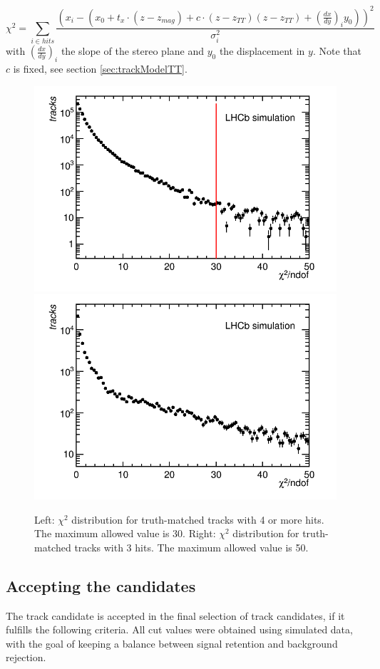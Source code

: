 \begin{equation}
\chi^{2} = \sum_{i \in hits} \frac{ \left(x_{i} - (x_{0} + t_{x}\cdot(z-z_{mag}) + c \cdot (z - z_{TT})(z - z_{TT}) + \left( \frac{dx}{dy} \right)_{i} y_{0}) \right)^{2}  }{\sigma_{i}^{2}}
\end{equation}
with $\left( \frac{dx}{dy} \right)_{i}$ the slope of the stereo plane and
$y_{0}$ the displacement in $y$. Note that $c$ is fixed, see section \ref{sec:trackModelTT}.

\begin{figure}[!htbp]
 \begin{center}
  \includegraphics[width=0.49\linewidth]{figures/chi2Cut1.png}
  \includegraphics[width=0.49\linewidth]{figures/chi2Cut3Hits1.png}
   \caption{Left: $\chi^{2}$ distribution for truth-matched tracks with 4 or more
   hits. The maximum allowed value is 30. Right: $\chi^{2}$ distribution for
   truth-matched tracks with 3 hits. The maximum allowed value is 50.
   \label{fig:chi2Cuts}}
 \end{center}
\end{figure}





\subsection{Accepting the candidates}
\label{sec:acceptCandidate}
The track candidate is accepted in the final selection of track candidates,
if it fulfills the following criteria. All cut values were obtained using simulated data, 
with the goal of keeping a balance between signal retention and background rejection. 

